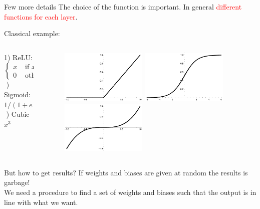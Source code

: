 \documentclass[10pt]{beamer}
\newcommand{\red}[1]{\textcolor{red}{#1}}
\newcommand{\ta}{\left(}
\newcommand{\tc}{\right)}
\renewcommand{\[}{\begin{equation*}}
\renewcommand{\]}{\end{equation*}}
\begin{document}
\begin{frame}{Few more details}
The choice of the function is important. In general \red{different functions for each layer}. 

Classical example:\\
\begin{columns}
\begin{column}{0.35\textwidth}
1) ReLU: 
$
\begin{cases}
x & \text{ if } x>0\\
0 & \text{ otherwise }
\end{cases}
$\\
$ $  ) Sigmoid: $1/\ta 1+e^{-x}\tc$\\
$ $  ) Cubic $x^3$

\end{column}
\begin{column}{0.5\textwidth}
\begin{figure}
\centering
\includegraphics[width = 0.45\textwidth]{Notes/Figures/relu.pdf}\ 
\includegraphics[width = 0.45\textwidth]{Notes/Figures/sigmoid.pdf}\\
\includegraphics[width = 0.45\textwidth]{Notes/Figures/cubic.pdf}
\end{figure}
\end{column}
\end{columns}

\end{frame}

\begin{frame}{But how to get results?}
If weights and biases are given at random the results is garbage!\\
We need a procedure to find a set of weights and biases such that the output is in line with what we want.
\end{frame}



\end{document}
